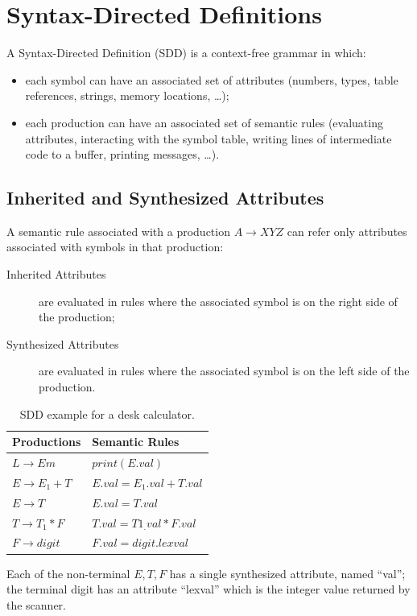 \section{Syntax-Directed Definitions}
A Syntax-Directed Definition (SDD) is a context-free grammar in which:
\begin{itemize}
	\item each symbol can have an associated set of attributes (numbers, types, table references, strings, memory locations, \ldots);
	\item each production can have an associated set of semantic rules (evaluating attributes, interacting with the symbol table, writing lines of intermediate code to a buffer, printing messages, \ldots).
\end{itemize}

\subsection{Inherited and Synthesized Attributes}
A semantic rule associated with a production $A \to XYZ$ can refer only attributes associated with symbols in that production:
\begin{description}
	\item[Inherited Attributes] are evaluated in rules where the associated symbol is on the right side of the production;
	\item[Synthesized Attributes] are evaluated in rules where the associated symbol is on the left side of the production.
\end{description}

\begin{table}[h]
	\centering
	\begin{tabular}{l|l}
		Productions & Semantic Rules \\ \hline
		$L \to Em$ & $print(E.val)$ \\ \hline
		$E \to E_1 + T$ & $E.val = E_1.val + T.val$ \\ \hline
		$E \to T$ & $E.val = T.val$ \\ \hline
		$T \to T_1 \ast F$ & $T.val = T1_.val \ast F.val$ \\ \hline
		$F \to digit$ & $F.val = digit.lexval$
	\end{tabular}
	\caption{SDD example for a desk calculator.}
\end{table}
Each of the non-terminal $E, T, F$ has a single synthesized attribute, named ``val''; the terminal digit has an attribute ``lexval'' which is the integer value returned by the scanner.

